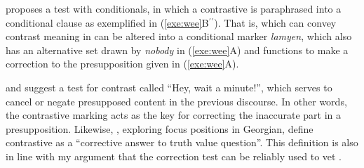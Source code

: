 


\citet{wee:01} proposes a test with conditionals, in which a contrastive 
is paraphrased into a conditional clause as exemplified in
(\ref{exe:wee}B$^\ensuremath{\prime}${}$^\ensuremath{\prime}$). That is, \nun which can convey contrast meaning in
 can be altered into a conditional marker \textit{lamyen},
which also has an alternative set drawn by \textit{nobody} in
(\ref{exe:wee}A) and functions to make a correction to the
presupposition given in (\ref{exe:wee}A).




\noindent \citet{fintel:04} and \citet{kim:12b} suggest a test for
contrast called ``Hey, wait a minute!'', which serves to cancel or
negate presupposed content in the previous discourse. In other words,
the contrastive marking acts as the key for correcting the inaccurate
part in a presupposition. Likewise, \citet{skopeteas:fanselow:10},
exploring focus positions in Georgian, define contrastive  as a
``corrective answer to truth value question''.  This definition is
also in line with my argument that the correction test can be reliably
used to vet .













